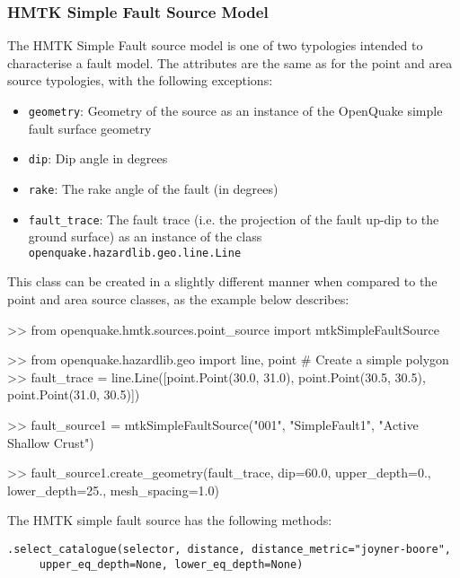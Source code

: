 \subsubsection{HMTK Simple Fault Source Model}

The HMTK Simple Fault source model is one of two typologies intended to characterise a fault model. The attributes are the same as for the point and area source typologies, with the following exceptions:


\begin{itemize}
\item \verb=geometry=: Geometry of the source as an instance of the OpenQuake simple fault surface geometry
\item \verb=dip=: Dip angle in degrees
\item \verb=rake=: The rake angle of the fault (in degrees)
\item \verb=fault_trace=: The fault trace (i.e. the projection of the fault up-dip to the ground surface) as an instance of the class \verb=openquake.hazardlib.geo.line.Line=
\end{itemize}

This class can be created in a slightly different manner when compared to the point and area source classes, as the example below describes:

\begin{python}[frame=single]
>> from openquake.hmtk.sources.point_source import mtkSimpleFaultSource

>> from openquake.hazardlib.geo import line, point
# Create a simple polygon
>> fault_trace = line.Line([point.Point(30.0, 31.0),
                            point.Point(30.5, 30.5),
                            point.Point(31.0, 30.5)]) 

>> fault_source1 = mtkSimpleFaultSource("001",
                                        "SimpleFault1",
                                        "Active Shallow Crust")

>> fault_source1.create_geometry(fault_trace, 
                                 dip=60.0,
                                 upper_depth=0.,
                                 lower_depth=25.,
                                 mesh_spacing=1.0)
\end{python}

The HMTK simple fault source has the following methods:

\verb;.select_catalogue(selector, distance, distance_metric="joyner-boore",;\\
\verb;     upper_eq_depth=None, lower_eq_depth=None);

